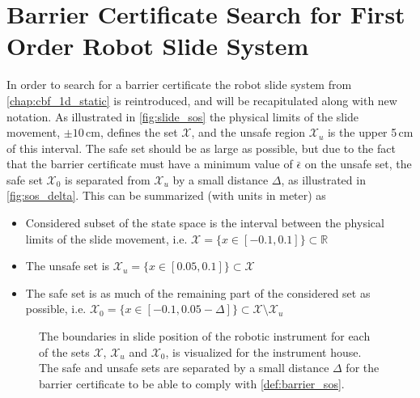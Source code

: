 
\section{Barrier Certificate Search for First Order Robot Slide System}\label{sec:sos_search_1storder}
In order to search for a barrier certificate the robot slide system from \autoref{chap:cbf_1d_static} is reintroduced, and will be recapitulated along with new notation. As illustrated in \autoref{fig:slide_sos} the physical limits of the slide movement, $\pm 10$\,cm,  defines the set $\mathcal{X}$, and the unsafe region $\mathcal{X}_u$ is the upper 5\,cm of this interval. The safe set should be as large as possible, but due to the fact that the barrier certificate must have a minimum value of $\bar{\epsilon}$ on the unsafe set, the safe set $\mathcal{X}_0$ is separated from $\mathcal{X}_u$ by a small distance $\Delta$, as illustrated in \autoref{fig:sos_delta}. This can be summarized  (with units in meter) as
\vspace{-2mm}
\begin{itemize}
\itemsep-0.7mm
\item Considered subset of the state space is the interval between the physical limits of the slide movement, i.e. $\mathcal{X}=\{x\in [-0.1,0.1] \}\subset\mathbb{R}$
\item The unsafe set is $\mathcal{X}_u=\{x\in [0.05,0.1] \}\subset\mathcal{X}$
\item The safe set is as much of the remaining part of the considered set as possible, i.e. $\mathcal{X}_0=\{x\in [-0.1,0.05-\Delta] \}\subset\mathcal{X}\setminus\mathcal{X}_u$
\end{itemize}

\vspace{-10mm}
\begin{figure}[H]
	\centering\hspace{10mm}
	\hspace{5mm}
	\caption{The boundaries in slide position of the robotic instrument for each of the sets $\mathcal{X}$, $\mathcal{X}_u$ and $\mathcal{X}_0$,  is visualized for the instrument house. The safe and unsafe sets are separated by a small distance $\Delta$ for the barrier certificate to be able to comply with \autoref{def:barrier_sos}.}
	\label{fig:sos_slide}
\end{figure}

